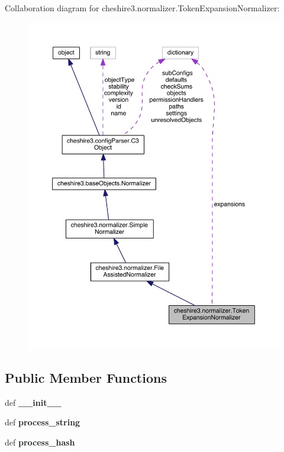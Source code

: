 Collaboration diagram for cheshire3.\-normalizer.\-Token\-Expansion\-Normalizer\-:
\nopagebreak
\begin{figure}[H]
\begin{center}
\leavevmode
\includegraphics[width=350pt]{classcheshire3_1_1normalizer_1_1_token_expansion_normalizer__coll__graph}
\end{center}
\end{figure}
\subsection*{Public Member Functions}
\begin{DoxyCompactItemize}
\item 
\hypertarget{classcheshire3_1_1normalizer_1_1_token_expansion_normalizer_a5441a27a24b8cc02898453ec954978f4}{def {\bfseries \-\_\-\-\_\-init\-\_\-\-\_\-}}\label{classcheshire3_1_1normalizer_1_1_token_expansion_normalizer_a5441a27a24b8cc02898453ec954978f4}

\item 
\hypertarget{classcheshire3_1_1normalizer_1_1_token_expansion_normalizer_a7b05a145242acdb3ba4646042c98e979}{def {\bfseries process\-\_\-string}}\label{classcheshire3_1_1normalizer_1_1_token_expansion_normalizer_a7b05a145242acdb3ba4646042c98e979}

\item 
\hypertarget{classcheshire3_1_1normalizer_1_1_token_expansion_normalizer_a95b75d8bdc81e097ffe9d9a74d099b5b}{def {\bfseries process\-\_\-hash}}\label{classcheshire3_1_1normalizer_1_1_token_expansion_normalizer_a95b75d8bdc81e097ffe9d9a74d099b5b}

\end{DoxyCompactItemize}
